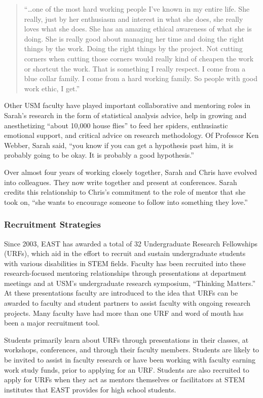 \documentclass[11.5pt]{sig-alternate} %
\begin{document}
\begin{large}
\begin{quote}
    “…one of the most hard working people I've known in my entire life. She really, just by her enthusiasm and interest in what she does, she really loves what she does. She has an amazing ethical awareness of what she is doing. She is really good about managing her time and doing the right things by the work. Doing the right things by the project. Not cutting corners when cutting those corners would really kind of cheapen the work or shortcut the work. That is something I really respect. I come from a blue collar family. I come from a hard working family. So people with good work ethic, I get.”
\end{quote}

Other USM faculty have played important collaborative and mentoring roles in Sarah's research in the form of statistical analysis advice, help in growing and anesthetizing “about 10,000 house flies” to feed her spiders, enthusiastic emotional support, and critical advice on research methodology. Of Professor Ken Webber, Sarah said, “you know if you can get a hypothesis past him, it is probably going to be okay. It is probably a good hypothesis.”

Over almost four years of working closely together, Sarah and Chris have evolved into colleagues. They now write together and present at conferences. Sarah credits this relationship to Chris's commitment to the role of mentor that she took on, “she wants to encourage someone to follow into something they love.”

\subsubsection*{Recruitment Strategies}
Since 2003, EAST has awarded a total of 32 Undergraduate Research Fellowships (URFs), which aid in the effort to recruit and sustain undergraduate students with various disabilities in STEM fields. Faculty has been recruited into these research-focused mentoring relationships through presentations at department meetings and at USM's undergraduate research symposium, “Thinking Matters.” At these presentations faculty are introduced to the idea that URFs can be awarded to faculty and student partners to assist faculty with ongoing research projects. Many faculty have had more than one URF and word of mouth has been a major recruitment tool.

Students primarily learn about URFs through presentations in their classes, at workshops, conferences, and through their faculty members. Students are likely to be invited to assist in faculty research or have been working with faculty earning work study funds, prior to applying for an URF. Students are also recruited to apply for URFs when they act as mentors themselves or facilitators at STEM institutes that EAST provides for high school students.


\end{large}
\end{document}
